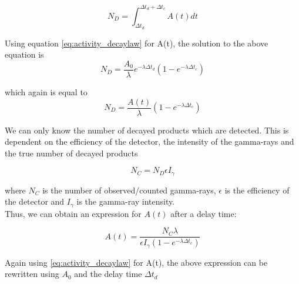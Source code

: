 \begin{equation}
    N_D = \int_{\Delta t_d}^{\Delta t_d + \Delta t_c} A(t) dt
\end{equation}

Using equation \ref{eq:activity_decaylaw} for A(t), the solution to the above equation is 
\begin{equation} \label{eq:numb_of_decayed}
    N_D= \frac{A_0}{\lambda}e^{-\lambda \Delta t_d}(1-e^{-\lambda \Delta t_c})
\end{equation}

which again is equal to
\begin{equation}
    N_D = \frac{A(t)}{\lambda} (1-e^{-\lambda \Delta t_c})
\end{equation}

We can only know the number of decayed products which are detected. This is dependent on the efficiency of the detector, the intensity of the gamma-rays and the true number of decayed products

\begin{equation}\label{eq:Ngamma}
    N_C  = N_D \epsilon I_\gamma
\end{equation}

where $N_C$ is the number of observed/counted gamma-rays, $\epsilon$ is the efficiency of the detector and $I_\gamma$ is the gamma-ray intensity.\\ 

\noindent
Thus, we can obtain an expression for $A(t)$ after a delay time: 

\begin{equation} \label{eq:Final_Expression_A}
    A(t) = \frac{N_C \lambda}{\epsilon I_\gamma (1-e^{-\lambda \Delta t_c})}
\end{equation}

\noindent 
Again using \ref{eq:activity_decaylaw} for A(t), the above expression can be rewritten using $A_0$ and the delay time $\Delta t_d$

